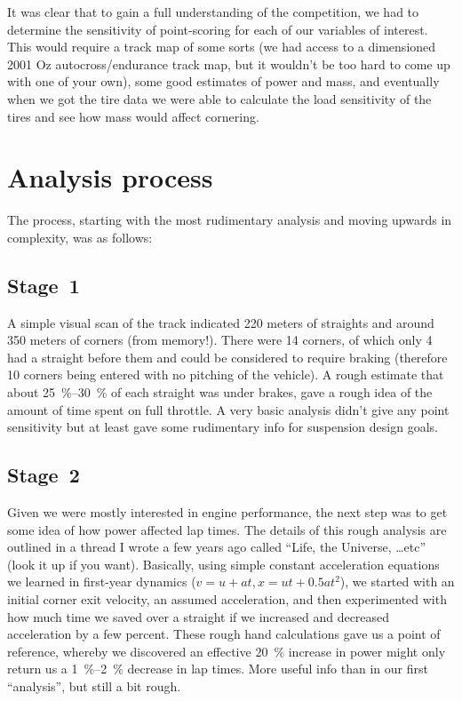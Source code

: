 \documentclass[10pt, a4paper, article, oneside, twocolumn, final]{memoir}
\begin{document}
It was clear that to gain a full understanding of the competition, we had to determine the sensitivity of point-scoring for each of our variables of interest. This would require a track map of some sorts (we had access to a dimensioned 2001 Oz autocross/\allowbreak endurance track map, but it wouldn’t be too hard to come up with one of your own), some good estimates of power and mass, and eventually when we got the tire data we were able to calculate the load sensitivity of the tires and see how mass would affect cornering. 

\section*{Analysis process}

The process, starting with the most rudimentary analysis and moving upwards in complexity, was as follows: 

\subsection*{Stage~1}
A simple visual scan of the track indicated \num{220} meters of straights and around \num{350} meters of corners (from memory!). There were \num{14} corners, of which only \num{4} had a straight before them and could be considered to require braking (therefore \num{10} corners being entered with no pitching of the vehicle). A rough estimate that about \SIrange{25}{30}{\percent} of each straight was under brakes, gave a rough idea of the amount of time spent on full throttle. A very basic analysis didn’t give any point sensitivity but at least gave some rudimentary info for suspension design goals.

\subsection*{Stage~2}
Given we were mostly interested in engine performance, the next step was to get some idea of how power affected lap times. The details of this rough analysis are outlined in a thread I wrote a few years ago called “Life, the Universe, \ldots etc” (look it up if you want). Basically, using simple constant acceleration equations we learned in first-year dynamics ($v = u + at, x = ut + \num{0.5}at^2$), we started with an initial corner exit velocity, an assumed acceleration, and then experimented with how much time we saved over a straight if we increased and decreased acceleration by a few percent. These rough hand calculations gave us a point of reference, whereby we discovered an effective \SI{20}{\percent} increase in power might only return us a \SIrange{1}{2}{\percent} decrease in lap times. More useful info than in our first “analysis”, but still a bit rough.
\end{document}
